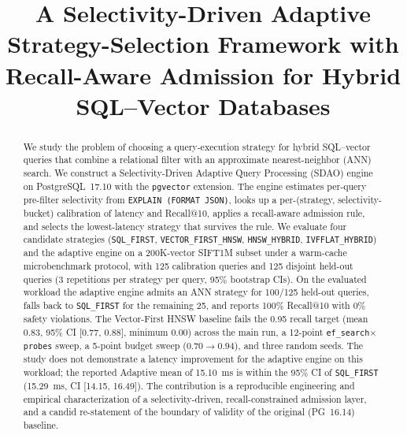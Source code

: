 \documentclass[conference]{IEEEtran}
\begin{document}
\title{A Selectivity-Driven Adaptive Strategy-Selection Framework with
Recall-Aware Admission for Hybrid SQL--Vector Databases}

\author{
}

\maketitle

\begin{abstract}
We study the problem of choosing a query-execution strategy for hybrid
SQL--vector queries that combine a relational filter with an approximate
nearest-neighbor (ANN) search. We construct a Selectivity-Driven Adaptive
Query Processing (SDAO) engine on PostgreSQL~17.10 with the
\texttt{pgvector} extension. The engine estimates per-query pre-filter
selectivity from \texttt{EXPLAIN (FORMAT JSON)}, looks up a
per-(strategy, selectivity-bucket) calibration of latency and Recall@10,
applies a recall-aware admission rule, and selects the lowest-latency
strategy that survives the rule. We evaluate four candidate strategies
(\texttt{SQL\_FIRST}, \texttt{VECTOR\_FIRST\_HNSW}, \texttt{HNSW\_HYBRID},
\texttt{IVFFLAT\_HYBRID}) and the adaptive engine on a 200K-vector SIFT1M
subset under a warm-cache microbenchmark protocol, with 125 calibration
queries and 125 disjoint held-out queries (3 repetitions per strategy per
query, 95\% bootstrap CIs). On the evaluated workload the adaptive engine
admits an ANN strategy for 100/125 held-out queries, falls back to
\texttt{SQL\_FIRST} for the remaining 25, and reports 100\% Recall@10 with
0\% safety violations. The Vector-First HNSW baseline fails the 0.95
recall target (mean 0.83, 95\% CI [0.77, 0.88], minimum 0.00) across the
main run, a 12-point \texttt{ef\_search}$\times$\texttt{probes} sweep, a
5-point budget sweep ($0.70 \rightarrow 0.94$), and three random seeds.
The study does not demonstrate a latency improvement for the adaptive
engine on this workload; the reported Adaptive mean of 15.10~ms is within
the 95\% CI of \texttt{SQL\_FIRST} (15.29~ms, CI [14.15, 16.49]). The
contribution is a reproducible engineering and empirical characterization
of a selectivity-driven, recall-constrained admission layer, and a candid
re-statement of the boundary of validity of the original (PG~16.14)
baseline.
\end{abstract}
\end{document}
